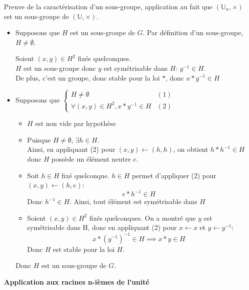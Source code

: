 \documentclass{article}
\renewenvironment{question_kholle}[2][ ]
{
	\subsection{\texorpdfstring{#2}{}}
	\notblank{#1}
	{
		\noindent #1
		\bigbreak
	}
	{}
	\begin{proof}
}
{
	\end{proof}
}
\begin{document}
\begin{question_kholle}{Preuve de la caractérisation d'un sous-groupe, application au fait que $(\mathbb U _n, \times)$ est un sous-groupe de $(\mathbb U, \times)$.}
  \;\\
  \begin{itemize}[label=$\star$]
    \item Supposons que $H$ est un sous-groupe de $G$.
          Par définition d'un sous-groupe, $H \neq \emptyset$.

          Soient $(x, y) \in H^{2}$ fixés quelconques.\\
          $H$ est un sous-groupe donc $y$ est symétrisable dans $H$: $y^{-1} \in H$.\\
          De plus, c'est un groupe, donc stable pour la loi $*$, donc $x*y^{-1} \in H$

    \item Supposons que $\left\{ \begin{array}{ll}H \neq \emptyset &(1) \\\forall (x, y) \in H^{2}, x * y^{-1} \in H & (2)\end{array}\right.$
          \begin{itemize}[label=$\lozenge$]
            \item $H$ est non vide par hypothèse
            \item Puisque $H \neq \emptyset$, $\exists h \in H$.\\
                  Ainsi, en appliquant (2) pour $(x,y)\leftarrow (h,h)$, on obtient $h * h^{-1} \in H$ donc $H$ possède un élément neutre $e$.
            \item Soit $h \in H$ fixé quelconque.
                  $h \in H$ permet d'appliquer (2) pour $(x,y) \leftarrow (h,e)$:
                  $$
                    e * h^{-1} \in H
                  $$
                  Donc $h^{-1} \in H$. Ainsi, tout élément est symétrisable dans $H$
            \item Soient $(x, y) \in H^{2}$ fixés quelconques. On a montré que $y$ est symétrisable dans H, donc en appliquant (2) pour $x \leftarrow x$ et $y \leftarrow y^{-1}$:
                  $$
                    x * (y^{-1})^{-1} \in H \implies x* y \in H
                  $$
                  Donc $H$ est stable pour la loi $H$.
          \end{itemize}
          Donc $H$ est un sous-groupe de $G$.
  \end{itemize}
\end{question_kholle}
\textbf{Application aux racines n-ièmes de l'unité}
\end{document}

